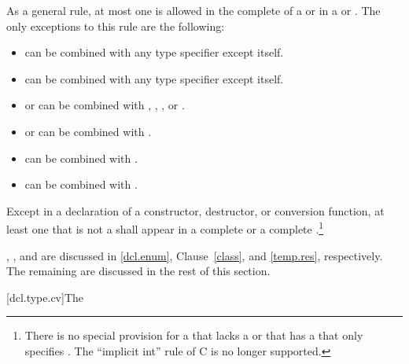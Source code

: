 \pnum
As a general rule, at most one 
is allowed in the complete
 of a  or in a
 or .
The only exceptions to this rule are the following:

\begin{itemize}
\item {} can be combined with any type specifier except itself.

\item {} can be combined with any type specifier except itself.

\item {} or  can be combined with
, , , or .

\item {} or  can be combined with .

\item {} can be combined with .

\item {} can be combined with .
\end{itemize}

\pnum
Except in a declaration of a constructor, destructor, or conversion
function, at least one  that is not a
 shall appear in a complete
 or a complete
.\footnote{There is no special
provision for a  that
lacks a  or that has a
 that only specifies .
The ``implicit int'' rule of C is no longer supported.}

\pnum
\begin{note}
,
,
and
are discussed
in
\ref{dcl.enum},
Clause~\ref{class},
and
\ref{temp.res}, respectively. The remaining
 are discussed in the rest of this section.
\end{note}

[dcl.type.cv]{The }%
%
%
%


